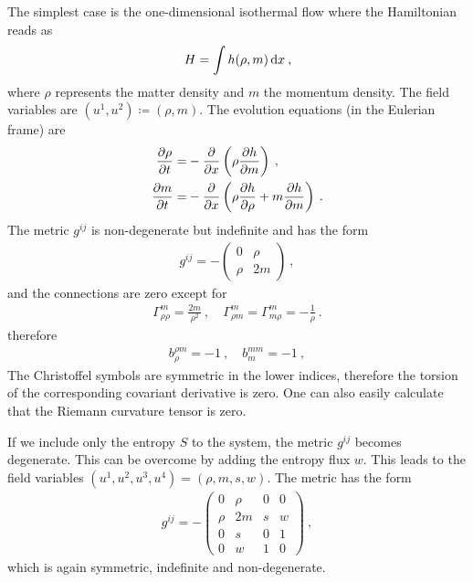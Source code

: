 \begin{example}
    The simplest case is the one-dimensional isothermal flow where the Hamiltonian reads as
    \begin{align}
        H = \int h(\rho, m) \, \mathrm{d} x \:,
    \end{align}
    where $\rho$ represents the matter density and $m$ the momentum density. 
    The field variables are $(u^1,u^2) \coloneqq (\rho,m)$.
    The evolution equations (in the Eulerian frame) are
    \begin{align}
        \frac{\partial \rho}{\partial t} =& - \frac{\partial }{\partial x} \left( \rho \frac{\partial h}{\partial m} \right) \:, \\
        \frac{\partial m}{\partial t} =& - \frac{\partial }{\partial x} \left( \rho \frac{\partial h}{\partial \rho} + m \frac{\partial h}{\partial m} \right) \:.
    \end{align}
    The metric $g^{ij}$ is non-degenerate but indefinite and has the form
    \begin{align}
        g^{ij} = -\begin{pmatrix}
            0 &  \rho \\
            \rho &  2 m
        \end{pmatrix} \:,
    \end{align}
    and the connections are zero except for
    \begin{align}
        \Gamma^{m}_{\rho \rho} = \frac{2m}{\rho^2} \:, \quad \Gamma^m_{\rho m} = \Gamma^m_{m \rho} = - \frac{1}{\rho} \:.
    \end{align}
    therefore
    \begin{align}
        b^{\rho m}_\rho = -1 \:, \quad b^{m m}_m = -1 \:,
    \end{align}
    The Christoffel symbols are symmetric in the lower indices, therefore the torsion of the corresponding covariant derivative is zero. One can also easily calculate that the Riemann curvature tensor is zero.
\end{example}

\begin{example}
    If we include only the entropy $S$ to the system, the metric $g^{ij}$ becomes degenerate. This can be overcome by adding the entropy flux $w$. This leads to the field variables $(u^1,u^2,u^3,u^4) = (\rho,m,s,w) $. The metric has the form
    \begin{align}
        g^{ij} = -\begin{pmatrix}
            0 & \rho & 0 & 0 \\
            \rho & 2m & s & w \\
            0 & s & 0 & 1 \\
            0 & w & 1 & 0
        \end{pmatrix} \:,
    \end{align}
    which is again symmetric, indefinite and non-degenerate.
\end{example}

